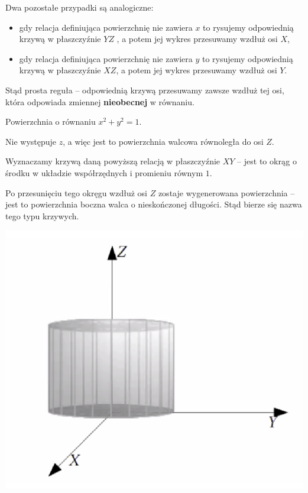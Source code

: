 Dwa pozostałe przypadki są analogiczne:

\begin{itemize}
    \item gdy relacja definiująca powierzchnię nie zawiera $x$ to rysujemy odpowiednią krzywą w płaszczyźnie $YZ$
    , a potem jej wykres przesuwamy wzdłuż osi $X$,
    \item gdy relacja definiująca powierzchnię nie zawiera $y$ to rysujemy odpowiednią krzywą w płaszczyźnie $XZ$,
    a potem jej wykres przesuwamy wzdłuż osi $Y$.
\end{itemize}

Stąd prosta reguła -- odpowiednią krzywą przesuwamy zawsze wzdłuż tej osi, która odpowiada zmiennej \textbf{nieobecnej} w równaniu. \\

\begin{przyklad}

Powierzchnia o równaniu $ x^2 + y^2 = 1 $.

Nie występuje $z$, a więc jest to powierzchnia walcowa równoległa do osi $Z$.

Wyznaczamy krzywą daną powyższą relacją w płaszczyźnie $XY$ -- jest to okrąg o środku w układzie współrzędnych i promieniu równym $1$.

Po przesunięciu tego okręgu wzdłuż osi $Z$ zostaje wygenerowana powierzchnia -- jest to powierzchnia boczna walca o nieskończonej długości.
Stąd bierze się nazwa tego typu krzywych.

\begin{center}
    \includegraphics[scale=0.6]{img/walec.png}
\end{center}

\end{przyklad}


